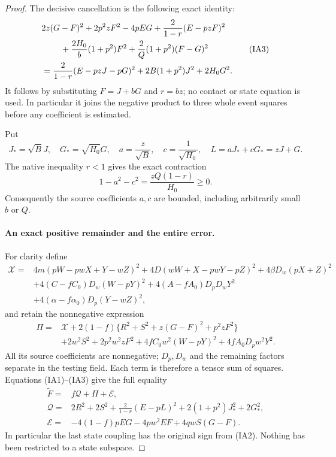 \begin{proof}
The decisive cancellation is the following exact identity:
\[
\begin{split}
 &2z(G-F)^2+2p^2zF^2-4pEG
 +\frac2{1-r}(E-pzF)^2\\
 &\hspace{8mm}+\frac{2H_0}{b}(1+p^2)F^2
                    +\frac2Q(1+p^2)(F-G)^2\\
 &=\frac2{1-r}(E-pzJ-pG)^2
                  +2B(1+p^2)J^2+2H_0G^2.
\end{split}                                                    \tag{IA3}
\]
It follows by substituting $F=J+bG$ and $r=bz$; no contact or state
equation is used. In particular it joins the negative product to
three whole event squares before any coefficient is estimated.

Put
\[
 J_* =\sqrt B J,\quad G_* =\sqrt{H_0}G,\quad
 a=\frac z{\sqrt B},\quad c=\frac1{\sqrt{H_0}},\quad
 L=aJ_*+cG_*=zJ+G.
\]
The native inequality $r<1$ gives the exact contraction
\[
 1-a^2-c^2=\frac{zQ(1-r)}{H_0}\ge0.                  \tag{IA4}
\]
Consequently the source coefficients $a,c$ are bounded, including
arbitrarily small $b$ or $Q$.

\paragraph{An exact positive remainder and the entire error.}
For clarity define
\[
\begin{split}
 \mathcal X={}&4m(pW-pwX+Y-wZ)^2
       +4D(wW+X-pwY-pZ)^2+4\beta D_w(pX+Z)^2\\
 &+4(C-fC_0)D_w(W-pY)^2
       +4(A-fA_0)D_pD_wY^2\\
 &+4(\alpha-f\alpha_0)D_p(Y-wZ)^2,
\end{split}
\]
and retain the nonnegative expression
\[
\begin{split}
 \Pi={}&\mathcal X
 +2(1-f)\{R^2+S^2+z(G-F)^2+p^2zF^2\}\\
 &+2w^2S^2+2p^2w^2zF^2
 +4fC_0w^2(W-pY)^2+4fA_0D_pw^2Y^2.
\end{split}                                                    \tag{IA5}
\]
All its source coefficients are nonnegative; $D_p,D_w$ and the
remaining factors separate in the testing field. Each term is
therefore a tensor sum of squares. Equations (IA1)--(IA3) give
the full equality
\[
\begin{split}
 \widetilde F={}&f\mathcal Q+\Pi+\mathcal E,\\
 \mathcal Q={}&2R^2+2S^2+\frac2{1-r}(E-pL)^2
                         +2(1+p^2)J_*^2+2G_*^2,\\
 \mathcal E={}&-4(1-f)pEG-4pw^2EF+4qwS(G-F).
\end{split}                                                    \tag{IA6}
\]
In particular the last state coupling has the original sign from
(IA2). Nothing has been restricted to a state subspace.


\end{proof}
